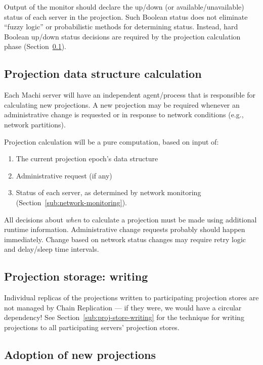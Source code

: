 \documentclass[preprint,10pt]{sigplanconf}
\begin{document}
Output of the monitor should declare the up/down (or
available/unavailable) status of each server in the projection.  Such
Boolean status does not eliminate ``fuzzy logic'' or probabilistic
methods for determining status.  Instead, hard Boolean up/down status
decisions are required by the projection calculation phase
(Section~\ref{subsub:projection-calculation}).

\subsection{Projection data structure calculation}
\label{subsub:projection-calculation}

Each Machi server will have an independent agent/process that is
responsible for calculating new projections.  A new projection may be
required whenever an administrative change is requested or in response
to network conditions (e.g., network partitions).

Projection calculation will be a pure computation, based on input of:

\begin{enumerate}
\item The current projection epoch's data structure
\item Administrative request (if any)
\item Status of each server, as determined by network monitoring
(Section~\ref{sub:network-monitoring}).
\end{enumerate}

All decisions about {\em when} to calculate a projection must be made
using additional runtime information.  Administrative change requests
probably should happen immediately.  Change based on network status
changes may require retry logic and delay/sleep time intervals.

\subsection{Projection storage: writing}
\label{sub:proj-storage-writing}

Individual replicas of the projections written to participating
projection stores are not managed by Chain Replication --- if they
were, we would have a circular dependency!  See
Section~\ref{sub:proj-store-writing} for the technique for writing
projections to all participating servers' projection stores.

\subsection{Adoption of new projections}
\end{document}
